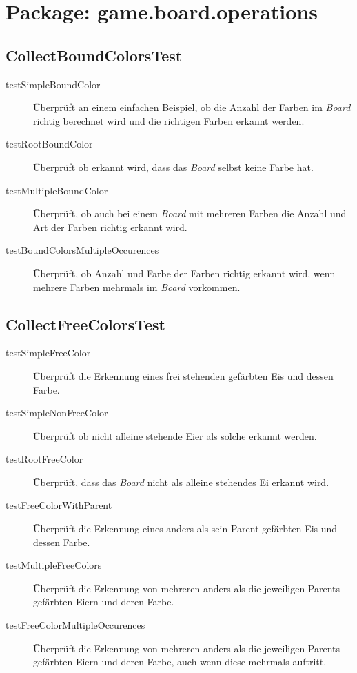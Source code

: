 \section{Package: game.board.operations}
\subsection{CollectBoundColorsTest}
	\begin{description}
		\item[testSimpleBoundColor] Überprüft an einem einfachen Beispiel, ob die Anzahl der Farben im \emph{Board} richtig
			berechnet wird und die richtigen Farben erkannt werden.
		\item[testRootBoundColor] Überprüft ob erkannt wird, dass das \emph{Board} selbst keine Farbe hat. 
		\item[testMultipleBoundColor] Überprüft, ob auch bei einem \emph{Board} mit mehreren Farben die Anzahl und Art der 
			Farben richtig erkannt wird.
		\item[testBoundColorsMultipleOccurences]Überprüft, ob Anzahl und Farbe der Farben richtig erkannt wird, wenn mehrere 
			Farben mehrmals im \emph{Board} vorkommen. 
	\end{description}

\subsection{CollectFreeColorsTest}
	\begin{description}
		\item[testSimpleFreeColor] Überprüft die Erkennung eines frei stehenden gefärbten Eis und dessen Farbe.
		\item[testSimpleNonFreeColor] Überprüft ob nicht alleine stehende Eier als solche erkannt werden.
		\item[testRootFreeColor]Überprüft, dass das \emph{Board} nicht als alleine stehendes Ei erkannt wird.
		\item[testFreeColorWithParent] Überprüft die Erkennung eines anders als sein Parent gefärbten Eis und dessen Farbe.
		\item[testMultipleFreeColors] Überprüft die Erkennung von mehreren anders als die jeweiligen Parents gefärbten Eiern 
			und deren Farbe.
		\item[testFreeColorMultipleOccurences]Überprüft die Erkennung von mehreren anders als die jeweiligen Parents gefärbten 
			Eiern und deren Farbe, auch wenn diese mehrmals auftritt.
	\end{description}

